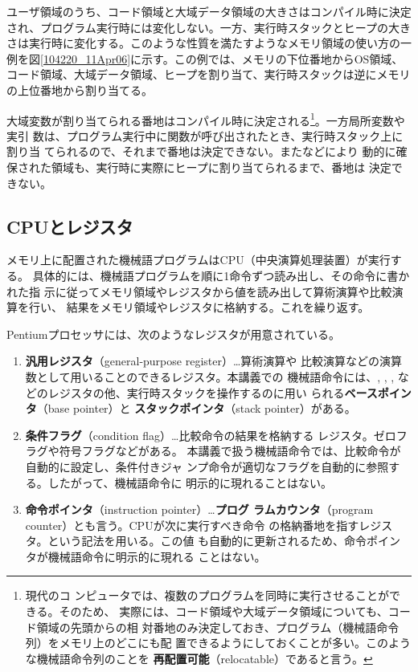 ユーザ領域のうち、コード領域と大域データ領域の大きさはコンパイル時に決定
され、プログラム実行時には変化しない。一方、実行時スタックとヒープの大き
さは実行時に変化する。このような性質を満たすようなメモリ領域の使い方の一
例を図\ref{104220_11Apr06}に示す。この例では、メモリの下位番地からOS領域、
コード領域、大域データ領域、ヒープを割り当て、実行時スタックは逆にメモリ
の上位番地から割り当てる。

大域変数が割り当てられる番地はコンパイル時に決定される\footnote{現代のコ
ンピュータでは、複数のプログラムを同時に実行させることができる。そのため、
実際には、コード領域や大域データ領域についても、コード領域の先頭からの相
対番地のみ決定しておき、プログラム（機械語命令列）をメモリ上のどこにも配
置できるようにしておくことが多い。このような機械語命令列のことを
{\bfseries 再配置可能}（relocatable）であると言う。}。一方局所変数や実引
数は、プログラム実行中に関数が呼び出されたとき、実行時スタック上に割り当
てられるので、それまで番地は決定できない。またなどにより
動的に確保された領域も、実行時に実際にヒープに割り当てられるまで、番地は
決定できない。

\subsection{CPUとレジスタ}

メモリ上に配置された機械語プログラムはCPU（中央演算処理装置）が実行する。
具体的には、機械語プログラムを順に1命令ずつ読み出し、その命令に書かれた指
示に従ってメモリ領域やレジスタから値を読み出して算術演算や比較演算を行い、
結果をメモリ領域やレジスタに格納する。これを繰り返す。

Pentiumプロセッサには、次のようなレジスタが用意されている。
\begin{enumerate}
 \item {\bfseries 汎用レジスタ}（general-purpose register）…算術演算や
       比較演算などの演算数として用いることのできるレジスタ。本講義での
       機械語命令には、, , ,
       などのレジスタの他、実行時スタックを操作するのに用い
       られる{\bfseries ベースポインタ}（base pointer）と
       {\bfseries スタックポインタ}（stack pointer）がある。
 \item {\bfseries 条件フラグ}（condition flag）…比較命令の結果を格納する
       レジスタ。ゼロフラグや符号フラグなどがある。
       本講義で扱う機械語命令では、比較命令が自動的に設定し、条件付きジャ
       ンプ命令が適切なフラグを自動的に参照する。したがって、機械語命令に
       明示的に現れることはない。
 \item {\bfseries 命令ポインタ}（instruction pointer）…{\bfseries プログ
       ラムカウンタ}（program counter）とも言う。CPUが次に実行すべき命令
       の格納番地を指すレジスタ。という記法を用いる。この値
       も自動的に更新されるため、命令ポインタが機械語命令に明示的に現れる
       ことはない。
\end{enumerate}

